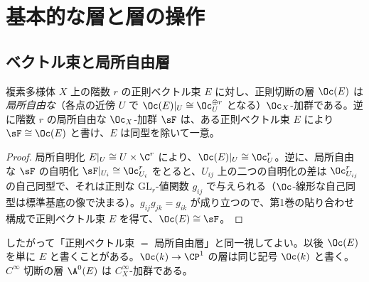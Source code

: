 \section{基本的な層と層の操作}\label{sec:examples}

\subsection{ベクトル束と局所自由層}
\begin{prop}\label{prop:locfree}\tP
複素多様体 $X$ 上の階数 $r$ の正則ベクトル束 $E$ に対し、正則切断の層 $\Oc(E)$ は\emph{局所自由な}（各点の近傍 $U$ で $\Oc(E)|_U\cong\Oc_U^{\oplus r}$ となる）$\Oc_X$-加群である。逆に階数 $r$ の局所自由な $\Oc_X$-加群 $\sF$ は、ある正則ベクトル束 $E$ により $\sF\cong\Oc(E)$ と書け、$E$ は同型を除いて一意。
\end{prop}
\begin{proof}
局所自明化 $E|_U\cong U\times\C^r$ により、$\Oc(E)|_U\cong\Oc_U^r$。逆に、局所自由な $\sF$ の自明化 $\sF|_{U_i}\cong\Oc_{U_i}^r$ をとると、$U_{ij}$ 上の二つの自明化の差は $\Oc_{U_{ij}}^r$ の自己同型で、それは正則な $\mathrm{GL}_r$-値関数 $g_{ij}$ で与えられる（$\Oc$-線形な自己同型は標準基底の像で決まる）。$g_{ij}g_{jk}=g_{ik}$ が成り立つので、第1巻の貼り合わせ構成で正則ベクトル束 $E$ を得て、$\Oc(E)\cong\sF$。\qedhere
\end{proof}
したがって「正則ベクトル束 $=$ 局所自由層」と同一視してよい。以後 $\Oc(E)$ を単に $E$ と書くことがある。$\Oc(k)\to\CP^1$ の層は同じ記号 $\Oc(k)$ と書く。$C^\infty$ 切断の層 $\A^0(E)$ は $C^\infty_X$-加群である。

